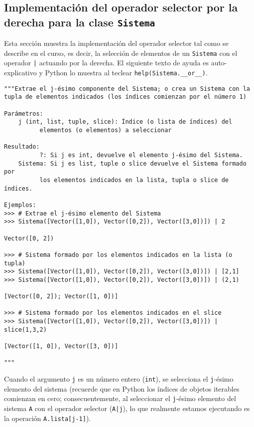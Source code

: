 \documentclass[11pt]{report}
\begin{document}
\subsection{Implementación del operador selector por la derecha para la clase \texttt{Sistema}}
\label{sec:orgf0a8ea7}

Esta sección muestra la implementación del operador selector tal como
se describe en el curso, es decir, la selección de elementos de un
\texttt{Sistema} con el operador \texttt{|} actuando por la derecha. El siguiente
texto de ayuda es auto-explicativo y Python lo muestra al teclear
\texttt{help(Sistema.\_\_or\_\_)}.

\begin{verbatim}
"""Extrae el j-ésimo componente del Sistema; o crea un Sistema con la
tupla de elementos indicados (los índices comienzan por el número 1)

Parámetros:
    j (int, list, tuple, slice): Índice (o lista de índices) del 
          elementos (o elementos) a seleccionar

Resultado:
          ?: Si j es int, devuelve el elemento j-ésimo del Sistema.
    Sistema: Si j es list, tuple o slice devuelve el Sistema formado por
          los elementos indicados en la lista, tupla o slice de índices.

Ejemplos:
>>> # Extrae el j-ésimo elemento del Sistema 
>>> Sistema([Vector([1,0]), Vector([0,2]), Vector([3,0])]) | 2

Vector([0, 2])

>>> # Sistema formado por los elementos indicados en la lista (o tupla)
>>> Sistema([Vector([1,0]), Vector([0,2]), Vector([3,0])]) | [2,1]
>>> Sistema([Vector([1,0]), Vector([0,2]), Vector([3,0])]) | (2,1)

[Vector([0, 2]); Vector([1, 0])]

>>> # Sistema formado por los elementos indicados en el slice
>>> Sistema([Vector([1,0]), Vector([0,2]), Vector([3,0])]) | slice(1,3,2)

[Vector([1, 0]), Vector([3, 0])]

"""
\end{verbatim}

Cuando el argumento \texttt{j} es un número entero (\texttt{int}), se selecciona el
\texttt{j}-ésimo elemento del sistema (recuerde que en Python los índices de
objetos iterables comienzan en cero; consecuentemente, al seleccionar
el \texttt{j}-ésimo elemento del sistema \texttt{A} con el operador selector
(\texttt{A|j}), lo que realmente estamos ejecutando es la operación
\texttt{A.lista[j-1]}).
\end{document}
